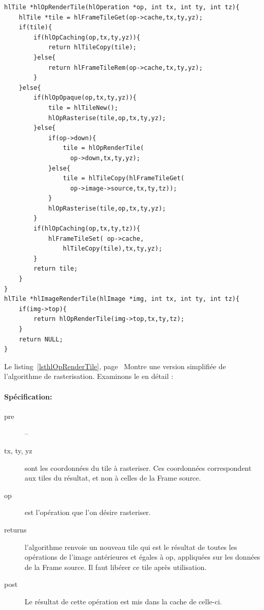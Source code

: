 		\begin{lstlisting}[float,caption={Rasterisation d'opérations},frame=tb,label=lsthlOpRenderTile]
hlTile *hlOpRenderTile(hlOperation *op, int tx, int ty, int tz){
	hlTile *tile = hlFrameTileGet(op->cache,tx,ty,yz);
	if(tile){
		if(hlOpCaching(op,tx,ty,yz)){
			return hlTileCopy(tile);
		}else{
			return hlFrameTileRem(op->cache,tx,ty,yz);
		}
	}else{
		if(hlOpOpaque(op,tx,ty,yz)){
			tile = hlTileNew();
			hlOpRasterise(tile,op,tx,ty,yz);
		}else{
			if(op->down){
				tile = hlOpRenderTile(
				  op->down,tx,ty,yz);
			}else{
				tile = hlTileCopy(hlFrameTileGet(
				  op->image->source,tx,ty,tz));
			}
			hlOpRasterise(tile,op,tx,ty,yz);
		}
		if(hlOpCaching(op,tx,ty,tz)){
			hlFrameTileSet(	op->cache,
				hlTileCopy(tile),tx,ty,yz);
		}
		return tile;
	}
}
hlTile *hlImageRenderTile(hlImage *img, int tx, int ty, int tz){
	if(img->top){
		return hlOpRenderTile(img->top,tx,ty,tz);
	}
	return NULL;
}
	\end{lstlisting}
		Le listing~\ref{lsthlOpRenderTile}, page~\pageref{lsthlOpRenderTile} Montre une version simplifiée de l'algorithme
		de rasterisation. Examinons le en détail :
		\paragraph{Spécification:}
		\begin{description}
			\item[pre] --
			\item[tx, ty, yz] sont les coordonnées du tile à rasteriser. Ces coordonnées correspondent aux tiles du résultat,
			et non à celles de la Frame source.
			\item[op] est l'opération que l'on désire rasteriser.
			\item[returns] l'algorithme renvoie un nouveau tile qui est le résultat de toutes les opérations de l'image antérieures
			et égales à op, appliquées sur les données de la Frame source. Il faut libérer ce tile après utilisation.
			\item[post] Le résultat de cette opération est mis dans la cache de celle-ci.
		\end{description}
		

